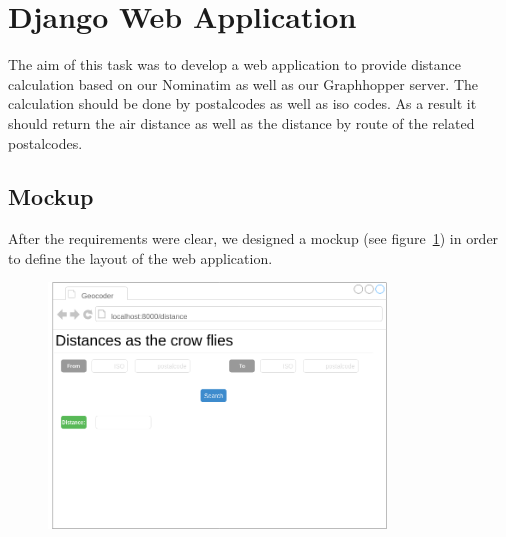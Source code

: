 
\section{Django Web Application}\label{sec:django}


The aim of this task was to develop a web application to provide distance calculation based on our Nominatim as well as our Graphhopper server. The calculation should be done by postalcodes as well as iso codes. As a result it should return the air distance as well as the distance by route of the related postalcodes.

\subsection{Mockup}

After the requirements were clear, we designed a mockup (see figure~\ref{fig:mockup}) in order to define the layout of the web application.

\begin{figure}[H]
\centering
\includegraphics[width=0.8\textwidth]{img/mockup}
\label{fig:mockup}
\end{figure}

